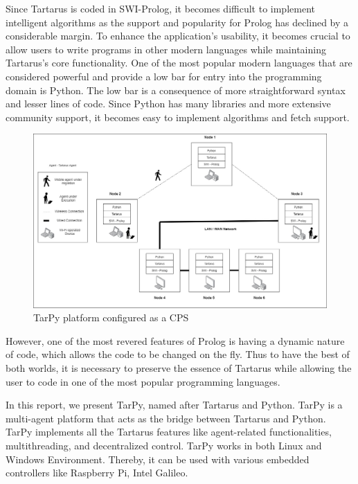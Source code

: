 \bigbreak
Since Tartarus is coded in SWI-Prolog, it becomes difficult to implement intelligent algorithms as the support and popularity for Prolog has declined by a considerable margin. To enhance the application's usability, it becomes crucial to allow users to write programs in other modern languages while maintaining Tartarus's core functionality. One of the most popular modern languages that are considered powerful and provide a low bar for entry into the programming domain is Python. The low bar is a consequence of more straightforward syntax and lesser lines of code. Since Python has many libraries and more extensive community support, it becomes easy to implement algorithms and fetch support.\par
\bigbreak
\begin{figure}[!ht]
    \centerline{\includegraphics[width=\linewidth]{images/Nodes.jpg}}
    \caption{TarPy platform configured as a CPS}
    \label{tarpy_cps}
\end{figure}

However, one of the most revered features of Prolog is having a dynamic nature of code, which allows the code to be changed on the fly. Thus to have the best of both worlds, it is necessary to preserve the essence of Tartarus while allowing the user to code in one of the most popular programming languages.\par
\bigbreak
In this report, we present TarPy, named after Tartarus and Python. TarPy is a multi-agent platform that acts as the bridge between Tartarus and Python. TarPy implements all the Tartarus features like agent-related functionalities, multithreading, and decentralized control. TarPy works in both Linux and Windows Environment. Thereby, it can be used with various embedded controllers like Raspberry Pi, Intel Galileo.\par

